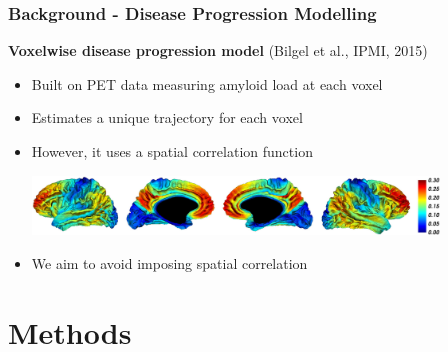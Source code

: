 \documentclass[8pt,xcolor=table]{beamer}
\begin{document}
\begin{frame}
\frametitle{Background - Disease Progression Modelling}

\newcommand{\mnpHeight}{3cm}

\vspace{-3em}
\textbf{Voxelwise disease progression model} (Bilgel et al., IPMI, 2015)
\begin{itemize}
  \item Built on PET data measuring amyloid load at each voxel
  \item Estimates a unique trajectory for each voxel
  \item However, it uses a spatial correlation function

  \vspace{2em}
  \includegraphics[width=0.85\textwidth]{bilgel_neuroimage}
  \vspace{2em}

  \item We aim to avoid imposing spatial correlation
  
  \end{itemize}



\end{frame}


\newcommand{\outFolder}{modelDiagram}
\newcommand{\lw}{0.5mm}

\section{Methods}
\end{document}

